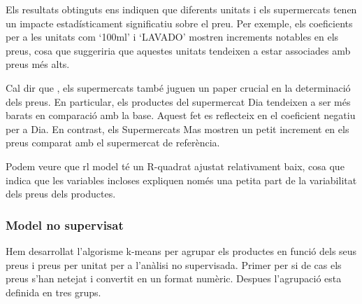 \documentclass[
]{article}
\begin{document}
Els resultats obtinguts ens indiquen que diferents unitats i els
supermercats tenen un impacte estadísticament significatiu sobre el
preu. Per exemple, els coeficients per a les unitats com `100ml' i
`LAVADO' mostren increments notables en els preus, cosa que suggeriria
que aquestes unitats tendeixen a estar associades amb preus més alts.

Cal dir que , els supermercats també juguen un paper crucial en la
determinació dels preus. En particular, els productes del supermercat
Dia tendeixen a ser més barats en comparació amb la base. Aquest fet es
reflecteix en el coeficient negatiu per a Dia. En contrast, els
Supermercats Mas mostren un petit increment en els preus comparat amb el
supermercat de referència.

Podem veure que rl model té un R-quadrat ajustat relativament baix, cosa
que indica que les variables incloses expliquen només una petita part de
la variabilitat dels preus dels productes.

\hypertarget{model-no-supervisat}{%
\subsubsection{Model no supervisat}\label{model-no-supervisat}}

Hem desarrollat l'algorisme k-means per agrupar els productes en funció
dels seus preus i preus per unitat per a l'anàlisi no supervisada.
Primer per si de cas els preus s'han netejat i convertit en un format
numèric. Despues l'agrupació esta definida en tres grups.
\end{document}
